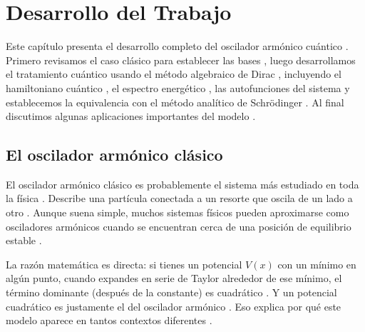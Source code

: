 \chapter{Desarrollo del Trabajo}
Este capítulo presenta el desarrollo completo del oscilador armónico cuántico \citep{schrodinger1926a, dirac1930}. Primero revisamos el caso clásico para establecer las bases \citep{newton1687, hamilton1834}, luego desarrollamos el tratamiento cuántico usando el método algebraico de Dirac \citep{dirac1930}, incluyendo el hamiltoniano cuántico \citep{schrodinger1926a}, el espectro energético \citep{schrodinger1926a, dirac1930}, las autofunciones del sistema \citep{schrodinger1926a} y establecemos la equivalencia con el método analítico de Schrödinger \citep{schrodinger1926a, schrodinger1926b}. Al final discutimos algunas aplicaciones importantes del modelo \citep{dirac1927, einstein1907, bornheisenberg1926}.

\section{El oscilador armónico clásico}

El oscilador armónico clásico es probablemente el sistema más estudiado en toda la física \citep{newton1687, lagrange1788}. Describe una partícula conectada a un resorte que oscila de un lado a otro \citep{hooke1678, newton1687}. Aunque suena simple, muchos sistemas físicos pueden aproximarse como osciladores armónicos cuando se encuentran cerca de una posición de equilibrio estable \citep{schrodinger1926a, dirac1930}.

La razón matemática es directa: si tienes un potencial $V(x)$ con un mínimo en algún punto, cuando expandes en serie de Taylor alrededor de ese mínimo, el término dominante (después de la constante) es cuadrático \citep{griffiths2018}. Y un potencial cuadrático es justamente el del oscilador armónico \citep{schrodinger1926a}. Eso explica por qué este modelo aparece en tantos contextos diferentes \citep{planck1901, einstein1907, dirac1927}.


